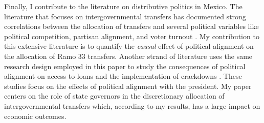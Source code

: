 \documentclass[dv_diss_main.tex]{subfiles}
\begin{document}
Finally, I contribute to the literature on distributive politics in Mexico. The literature that focuses on intergovernmental transfers has documented strong correlations between the allocation of transfers and several political variables like political competition, partisan alignment, and voter turnout \citep{diaz2004descentralizacion,langston2010governors,trillo2007transferences}. My contribution to this extensive literature is to quantify the \textit{causal} effect of political alignment on the allocation of Ramo 33 transfers. Another strand of literature uses the same research design employed in this paper to study the consequences of political alignment on access to loans and the implementation of crackdowns \citep{de2020political,dell2015trafficking}. These studies focus on the effects of political alignment with the president. My paper centers on the role of state governors in the discretionary allocation of intergovernmental transfers which, according to my results, has a large impact on economic outcomes. 
\end{document}
